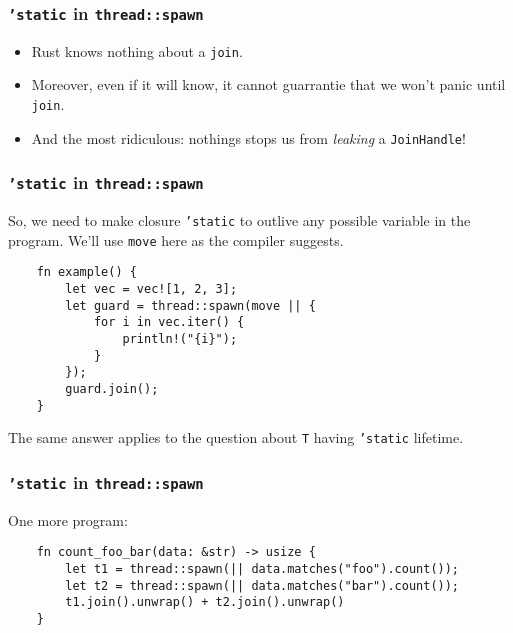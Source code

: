 \documentclass[aspectratio=1610,t]{beamer}
\begin{document}

\begin{frame}[fragile]
\frametitle{\texttt{'static} in \texttt{thread::spawn}}
\begin{itemize}
    \item Rust knows nothing about a \texttt{join}.
    \item Moreover, even if it will know, it cannot guarrantie that we won't panic until \texttt{join}.
    \item And the most ridiculous: nothings stops us from \textit{leaking} a \texttt{JoinHandle}!
\end{itemize}
\end{frame}


\begin{frame}[fragile]
\frametitle{\texttt{'static} in \texttt{thread::spawn}}
So, we need to make closure \texttt{'static} to outlive any possible variable in the program. We'll use \texttt{move} here as the compiler suggests.

\begin{verbatim}
    fn example() {
        let vec = vec![1, 2, 3];
        let guard = thread::spawn(move || {
            for i in vec.iter() {
                println!("{i}");
            }
        });
        guard.join();
    }
\end{verbatim}

The same answer applies to the question about \texttt{T} having \texttt{'static} lifetime.
\end{frame}


\begin{frame}[fragile]
\frametitle{\texttt{'static} in \texttt{thread::spawn}}
One more program:

\begin{verbatim}
    fn count_foo_bar(data: &str) -> usize {
        let t1 = thread::spawn(|| data.matches("foo").count());
        let t2 = thread::spawn(|| data.matches("bar").count());
        t1.join().unwrap() + t2.join().unwrap()
    }
\end{verbatim}
\end{frame}

\end{document}
